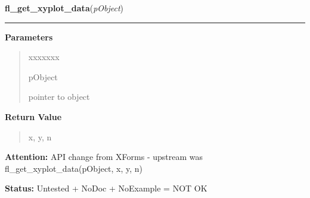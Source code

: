 \hspace{.8\funcindent}\begin{boxedminipage}{\funcwidth}

    \raggedright \textbf{fl\_get\_xyplot\_data}(\textit{pObject})

    \vspace{-1.5ex}

    \rule{\textwidth}{0.5\fboxrule}
\setlength{\parskip}{2ex}
\setlength{\parskip}{1ex}
      \textbf{Parameters}
      \vspace{-1ex}

      \begin{quote}
        \begin{Ventry}{xxxxxxx}

          \item[pObject]

          pointer to object

        \end{Ventry}

      \end{quote}

      \textbf{Return Value}
    \vspace{-1ex}

      \begin{quote}
      x, y, n

      \end{quote}

\textbf{Attention:} API change from XForms - upstream was fl\_get\_xyplot\_data(pObject, x, y, 
n)



\textbf{Status:} Untested + NoDoc + NoExample = NOT OK



    \end{boxedminipage}

    \label{xformslib:library:fl_get_xyplot_data_pointer}

    \vspace{0.5ex}

